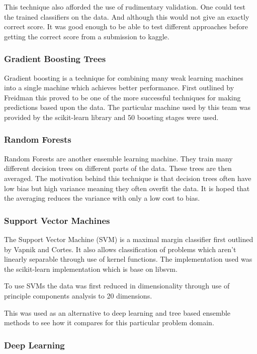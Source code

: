 \documentclass[a4paper, 11pt, twocolumn]{report}
\begin{document}
This technique also afforded the use of rudimentary validation. One could test the trained classifiers on the data. And although this would not give an exactly correct score. It was good enough to be able to test different approaches before getting the correct score from a submission to kaggle.


\subsubsection{Gradient Boosting Trees}
Gradient boosting is a technique for combining many weak learning machines into a single machine which achieves better performance. First outlined by Freidman \cite{friedman2001greedy} this proved to be one of the more successful techniques for making predictions based upon the data. The particular machine used by this team was provided by the scikit-learn library and 50 boosting stages were used.

\subsubsection{Random Forests}
Random Forests are another ensemble learning machine. They train many different decision trees on different parts of the data. These trees are then averaged. The motivation behind this technique is that decision trees often have low bias but high variance meaning they often overfit the data. It is hoped that the averaging reduces the variance with only a low cost to bias.


\subsubsection{Support Vector Machines}
The Support Vector Machine (SVM) is a maximal margin classifier first outlined by Vapnik and Cortes\cite{cortes1995support}. It also allows classification of problems which aren't linearly separable through use of kernel functions. The implementation used was the scikit-learn implementation which is base on libsvm.

To use SVMs the data was first reduced in dimensionality through use of principle components analysis to 20 dimensions.

This was used as an alternative to deep learning and tree based ensemble methods to see how it compares for this particular problem domain.

\subsubsection{Deep Learning}
\end{document}

